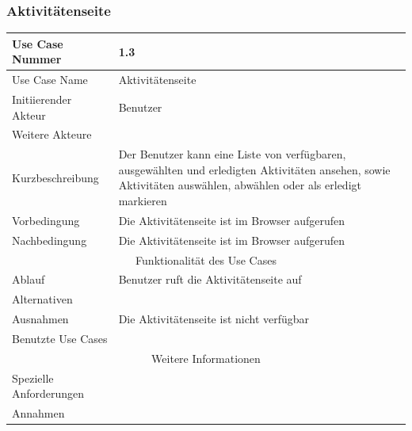 \documentclass[10pt,a4paper]{article}
\begin{document}
	\subsubsection{Aktivit\"atenseite}
	\begin{tabularx}{\textwidth}{|l|X|}
	\hline Use Case Nummer & 1.3 \\ 
	\hline Use Case Name & Aktivit\"atenseite \\ 
	\hline Initiierender Akteur & Benutzer \\
	\hline Weitere Akteure & \\
	\hline Kurzbeschreibung & Der Benutzer kann eine Liste von verf\"ugbaren, ausgew\"ahlten und erledigten Aktivit\"aten ansehen, sowie Aktivit\"aten ausw\"ahlen, abw\"ahlen oder als erledigt markieren \\
	\hline Vorbedingung & Die Aktivit\"atenseite ist im Browser aufgerufen \\
	\hline Nachbedingung & Die Aktivit\"atenseite ist im Browser aufgerufen \\
	\hline \multicolumn{2}{|c|}{Funktionalität des Use Cases}\\
	\hline Ablauf & Benutzer ruft die Aktivit\"atenseite auf \\
	\hline Alternativen & \\
	\hline Ausnahmen & Die Aktivit\"atenseite ist nicht verf\"ugbar \\
	\hline Benutzte Use Cases & \\
	\hline \multicolumn{2}{|c|}{Weitere Informationen} \\
	\hline Spezielle Anforderungen & \\
	\hline Annahmen & \\
	\hline
	\end{tabularx} 
\end{document}
